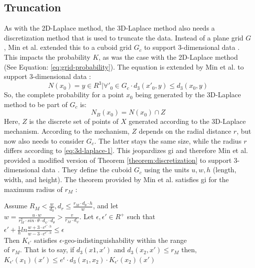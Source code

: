 \newpage
\subsection{Truncation}
As with the 2D-Laplace method, the 3D-Laplace method also needs a discretization method that is used to truncate the data.
Instead of a plane grid $G$, Min et al. extended this to a cuboid grid $G_c$ to support 3-dimensional data \citep{9646489}.
This impacts the probability $K$, as was the case with the 2D-Laplace method (See Equation: \ref{eq:grid-probability}).
The equation is extended by Min et al. to support 3-dimensional data \citep{9646489}:
\begin{equation}
  N(x_0) = { y \in R^3 | \forall'_{0} \in G_c \cdot d_3(x'_{0}, y) \leq d_3(x_0, y)}
  \label{eq:3d-grid-probability}
\end{equation}
So, the complete probability for a point $x_0$ being generated by the 3D-Laplace method to be part of $G_c$ is:
\begin{equation}
  N_B(x_0) = N(x_0) \cap Z
  \label{eq:3d-grid-probability-2}
\end{equation}
Here, $Z$ is the discrete set of points of $X$ generated according to the 3D-Laplace mechanism.
According to the mechanism, $Z$ depends on the radial distance $r$, but now also needs to consider $G_c$.
The latter stays the same size, while the radius $r$ differs according to \ref{eq:3d-laplace-1}.
This jeopardizes \gls{gi} and therefore Min et al. provided a modified version of Theorem \ref{theorem:discretization} to support 3-dimensional data \citep{9646489}.
They define the cuboid $G_c$ using the units $u, w, h$ (length, width, and height).
The theorem provided by Min et al. satisfies \gls{gi} for the maximum radius of $r_M$ \citep{9646489}:
\begin{theorem}
  Assume $R_M < \frac{w}{d_0}, d_r \leq \frac{r_M \cdot d_\theta \cdot h}{w}$, and let \\
  $w = \frac{u \cdot w}{r^2_M \cdot sin \cdot \theta \cdot d_\psi \cdot d_\theta} > \frac{v}{r_M \cdot d_\psi}$. Let $\epsilon, \epsilon' \in R^+$ such that \\
  $\epsilon' + \frac{1}{h} ln \frac{w + 3 \cdot e^{\epsilon' \cdot h}}{w - 3 \cdot e^{\epsilon' \cdot h}} \leq \epsilon$ \\
  Then $K_{\epsilon'}$ satisfies $\epsilon$-geo-indistinguishability within the range \\
  of $r_M$. That is to say, if $d_3(x1, x')$ and $d_3(x_2, x') \leq r_M$ then, \\
  $K_{\epsilon'}(x_1)(x') \leq e^\epsilon \cdot d_3(x_1, x_2) \cdot K_{\epsilon'}(x_2)(x')$
  \label{theorem:3d-discretization}
\end{theorem}
